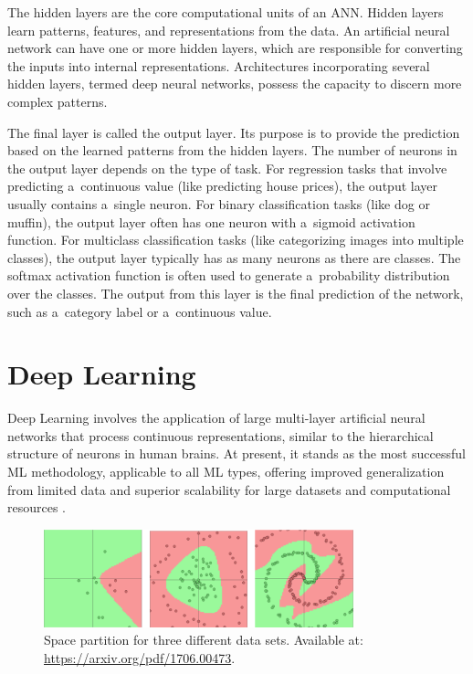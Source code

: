 The hidden layers are the core computational units of an ANN. Hidden layers learn patterns, features, and representations from the data. An artificial neural network can have one or more hidden layers, which are responsible for converting the inputs into internal representations. Architectures incorporating several hidden layers, termed deep neural networks, possess the capacity to discern more complex patterns.

The final layer is called the output layer. Its purpose is to provide the prediction based on the learned patterns from the hidden layers. The number of neurons in the output layer depends on the type of task. For regression tasks that involve predicting a~continuous value (like predicting house prices), the output layer usually contains a~single neuron. For binary classification tasks (like dog or muffin), the output layer often has one neuron with a~sigmoid activation function. For multiclass classification tasks (like categorizing images into multiple classes), the output layer typically has as many neurons as there are classes. The softmax activation function is often used to generate a~probability distribution over the classes. The output from this layer is the final prediction of the network, such as a~category label or a~continuous value.

\section{Deep Learning}

Deep Learning involves the application of large multi-layer artificial neural networks that process continuous representations, similar to the hierarchical structure of neurons in human brains. At present, it stands as the most successful ML methodology, applicable to all ML types, offering improved generalization from limited data and superior scalability for large datasets and computational resources \cite{manning2020ai}.

\begin{figure}[htbp]
    \centering
    \includegraphics[width=0.8\textwidth]{obrazky-figures/02-theoretical-basis/cnn-ds.png}
    \caption{Space partition for three different data sets. Available at: \url{https://arxiv.org/pdf/1706.00473}.}
    \label{fig:cnn-ds}
\end{figure}

